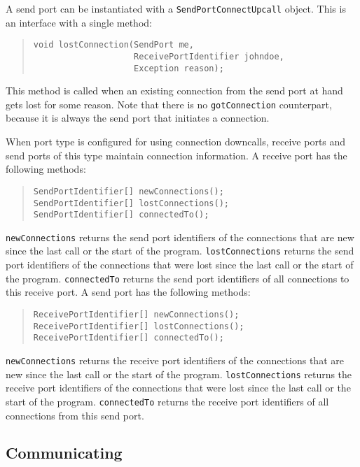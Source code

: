 \documentclass[10pt]{article}
\newcommand{\mysubsection}[1]{\subsection{#1}\label{#1}}
\begin{document}
A send port can be instantiated with a
\verb+SendPortConnectUpcall+ object. This is an interface with a single method:

\begin{quote}
\begin{verbatim}
void lostConnection(SendPort me,
                    ReceivePortIdentifier johndoe,
                    Exception reason);
\end{verbatim}
\end{quote}
\noindent 
This method is called when an existing connection from the send port at
hand gets lost for some reason. Note that there is no \verb+gotConnection+
counterpart, because it is always the send port that initiates a connection.

When port type is configured for using connection downcalls, receive ports
and send ports of this type maintain connection information.
A receive port has the following methods:

\begin{quote}
\begin{verbatim}
SendPortIdentifier[] newConnections();
SendPortIdentifier[] lostConnections();
SendPortIdentifier[] connectedTo();
\end{verbatim}
\end{quote}

\verb+newConnections+ returns the send port identifiers of the connections
that are new since the last call or the start of the program.
\verb+lostConnections+ returns the send port identifiers of the connections
that were lost since the last call or the start of the program.
\verb+connectedTo+ returns the send port identifiers of all connections
to this receive port.
A send port has the following methods:

\begin{quote}
\begin{verbatim}
ReceivePortIdentifier[] newConnections();
ReceivePortIdentifier[] lostConnections();
ReceivePortIdentifier[] connectedTo();
\end{verbatim}
\end{quote}
\noindent
\verb+newConnections+ returns the receive port identifiers of the connections
that are new since the last call or the start of the program.
\verb+lostConnections+ returns the receive port identifiers of the connections
that were lost since the last call or the start of the program.
\verb+connectedTo+ returns the receive port identifiers of all connections
from this send port.

\mysubsection{Communicating}
\end{document}
